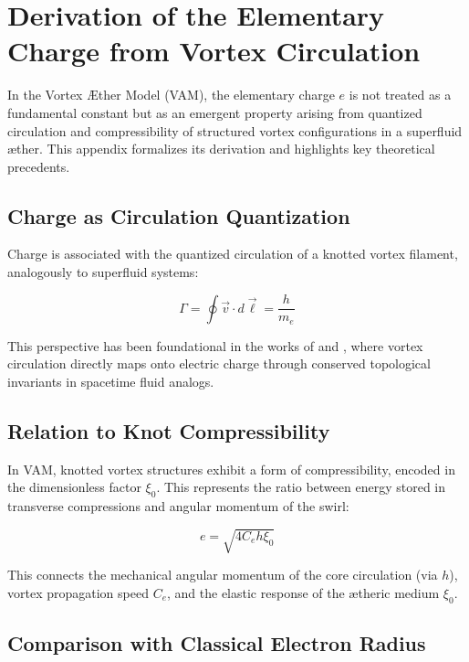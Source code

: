 \section{Derivation of the Elementary Charge from Vortex Circulation}
\label{appendix:charge}

In the Vortex Æther Model (VAM), the elementary charge \( e \) is not treated as a fundamental constant but as an emergent property arising from quantized circulation and compressibility of structured vortex configurations in a superfluid æther. This appendix formalizes its derivation and highlights key theoretical precedents.

\subsection*{Charge as Circulation Quantization}

Charge is associated with the quantized circulation of a knotted vortex filament, analogously to superfluid systems:

\begin{equation}
    \Gamma = \oint \vec{v} \cdot d\vec{\ell} = \frac{h}{m_e}
\end{equation}

This perspective has been foundational in the works of \cite{kiehn2005topological} and \cite{sbitnev2015hydro2}, where vortex circulation directly maps onto electric charge through conserved topological invariants in spacetime fluid analogs.

\subsection*{Relation to Knot Compressibility}

In VAM, knotted vortex structures exhibit a form of compressibility, encoded in the dimensionless factor \( \xi_0 \). This represents the ratio between energy stored in transverse compressions and angular momentum of the swirl:

\begin{equation}
    e = \sqrt{4 C_e h \xi_0}
\end{equation}

This connects the mechanical angular momentum of the core circulation (via \( h \)), vortex propagation speed \( C_e \), and the elastic response of the ætheric medium \( \xi_0 \).

\subsection*{Comparison with Classical Electron Radius}

